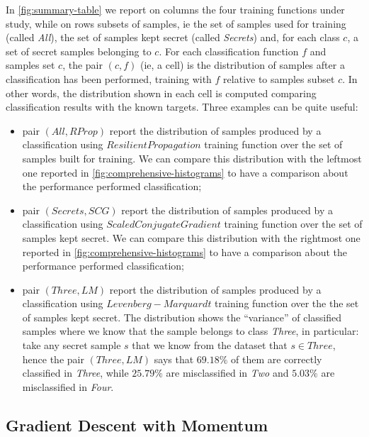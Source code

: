 \documentclass[10pt,a4paper]{article}
\begin{document}
    In \autoref{fig:summary-table} we report on columns the four training functions under study,
    while on rows subsets of samples, ie the set of samples used for training (called \emph{All}), 
    the set of samples kept secret (called \emph{Secrets}) and, for each class $c$, a set of secret samples belonging to $c$.
    For each classification function $f$ and samples set $c$, the pair $(c, f)$ (ie, a cell) 
    is the distribution of samples after a classification has been performed, training with $f$
    relative to samples subset $c$. In other words, the distribution shown in each cell is
    computed comparing classification results with the known targets. Three examples 
    can be quite useful:
    \begin{itemize}
        \item pair $(All, RProp)$ report the distribution of samples produced by a classification
        using $Resilient Propagation$ training function over the set of samples built for training.
        We can compare this distribution with the leftmost one reported in \autoref{fig:comprehensive-histograms}
        to have a comparison about the performance performed classification;

        \item pair $(Secrets, SCG)$ report the distribution of samples produced by a classification
        using $Scaled Conjugate Gradient$ training function over the set of samples kept secret.
        We can compare this distribution with the rightmost one reported in \autoref{fig:comprehensive-histograms}
        to have a comparison about the performance performed classification;

        \item pair $(Three, LM)$ report the distribution of samples produced by a classification
        using $Levenberg-Marquardt$ training function over the the set of samples kept secret.
        The distribution shows the ``variance'' of classified samples where we know that the
        sample belongs to class \emph{Three}, in particular: take any secret sample $s$ that we know from the 
        dataset that $s \in Three$, hence the pair $(Three, LM)$ says that $69.18 \%$ of them
        are correctly classified in \emph{Three}, while $25.79 \%$ are misclassified in \emph{Two} and 
        $5.03 \%$ are misclassified in \emph{Four}.


    \end{itemize}
    

    \subsection{Gradient Descent with Momentum}
\end{document}
